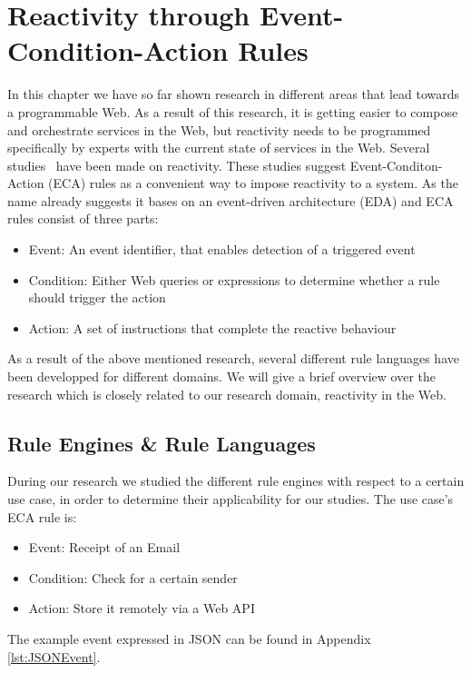 \section{Reactivity through Event-Condition-Action Rules}
In this chapter we have so far shown research in different areas that lead towards a programmable Web.
As a result of this research, it is getting easier to compose and orchestrate services in the Web, but reactivity needs to be programmed specifically by experts with the current state of services in the Web.
Several studies~\cite{2007_AlferesR3}\cite{2005-Bry_etal-XChange.pdf}\cite{10.1007-11896548_63}\cite{papamarkos2004rdftl}\cite{2012-Paschke_etal-ReactionRuleML.pdf} have been made on reactivity.
These studies suggest Event-Conditon-Action (\textrm{ECA}) rules as a convenient way to impose reactivity to a system.
As the name already suggests it bases on an event-driven architecture (\textrm{EDA}) and \textrm{ECA} rules consist of three parts:
\begin{itemize}
  \item Event: An event identifier, that enables detection of a triggered event
  \item Condition: Either Web queries or expressions to determine whether a rule should trigger the action
  \item Action: A set of instructions that complete the reactive behaviour
\end{itemize}

As a result of the above mentioned research, several different rule languages have been developped for different domains.
We will give a brief overview over the research which is closely related to our research domain, reactivity in the Web.


\subsection{Rule Engines \& Rule Languages}
During our research we studied the different rule engines with respect to a certain use case, in order to determine their applicability for our studies.
The use case's ECA rule is:
\begin{itemize}
  \item Event: Receipt of an Email
  \item Condition: Check for a certain sender
  \item Action: Store it remotely via a Web API
\end{itemize}
The example event expressed in JSON can be found in Appendix \ref{lst:JSONEvent}.


